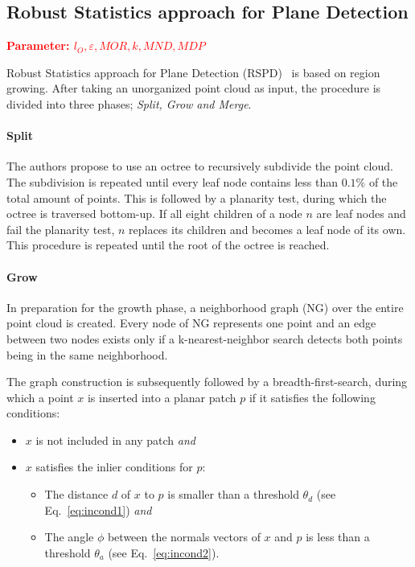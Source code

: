 \documentclass[main.tex]{subfiles}
\begin{document}
\subsection{Robust Statistics approach for Plane Detection}
\label{subsec:bg-rspd}

\textbf{\textcolor{red}{Parameter: $l_O, \varepsilon, MOR, k, MND, MDP$}}

Robust Statistics approach for Plane Detection (RSPD)~\cite{Araújo_Oliveira_2020} is based on region growing. After taking an unorganized point cloud as input, the procedure is divided into three phases;
\textit{Split, Grow and Merge}.

\paragraph*{Split}
The authors propose to use an octree to recursively subdivide the point cloud. The subdivision is repeated until every leaf node contains less than $0.1\%$ of the total amount
of points.
This is followed by a planarity test, during which the octree is traversed bottom-up. If all eight children of a node $n$ are leaf nodes and fail the planarity test, $n$ replaces its children
and becomes a leaf node of its own. This procedure is repeated until the root of the octree is reached.

\paragraph*{Grow}
In preparation for the growth phase, a neighborhood graph (NG) over the entire point cloud is created. Every node of NG represents one point and an edge between two nodes exists only if
a k-nearest-neighbor search detects both points being in the same neighborhood.

The graph construction is subsequently followed by a breadth-first-search, during which a point $x$ is inserted into a planar patch $p$ if it satisfies the following conditions:
\begin{itemize}
    \item $x$ is not included in any patch \textit{and}
    \item $x$ satisfies the inlier conditions for $p$: %
          \begin{itemize}
              \item The distance $d$ of $x$ to $p$ is smaller than a threshold $\theta_d$ (see Eq.~\ref{eq:incond1}) \textit{and} %
              \item The angle $\phi$ between the normals vectors of $x$ and $p$ is less than a threshold $\theta_a$ (see Eq.~\ref{eq:incond2}). %
          \end{itemize}
\end{itemize}
\end{document}
